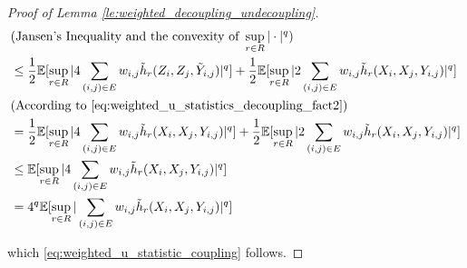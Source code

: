 \documentclass[letterpaper]{article} %
\def\SingleColumnEnd{}
\newcommand{\E}{\mathbb{E}}
\newcommand{\pair}[1]{(#1)}
\begin{document}
\begin{proof}[Proof of Lemma \ref{le:weighted_decoupling_undecoupling}]
\begin{align*}
        &(\text{Jansen's Inequality and the convexity of }\sup_{r\in R}|\cdot|^q)\\
        &\le \frac{1}{2}\E[\sup_{r\in R} |4\sum_{\pair{i,j}\in E}w_{i,j}\tilde{h}_r(Z_i,Z_j,\tilde{Y}_{i,j})|^q] + \frac{1}{2}\E[\sup_{r\in R} |2\sum_{\pair{i,j}\in E}w_{i,j}\tilde{h}_r(X_i,X_j,Y_{i,j})|^q]\\
        &(\text{According to }\eqref{eq:weighted_u_statistics_decoupling_fact2})\\
        &= \frac{1}{2}\E[\sup_{r\in R} |4\sum_{\pair{i,j}\in E}w_{i,j}\tilde{h}_r(X_i,X_j,Y_{i,j})|^q] + \frac{1}{2}\E[\sup_{r\in R} |2\sum_{\pair{i,j}\in E}w_{i,j}\tilde{h}_r(X_i,X_j,Y_{i,j})|^q]\\
        &\le \E[\sup_{r\in R} |4\sum_{\pair{i,j}\in E}w_{i,j}\tilde{h}_r(X_i,X_j,Y_{i,j})|^q]\\
        &= 4^q\E[\sup_{r\in R} |\sum_{\pair{i,j}\in E}w_{i,j}\tilde{h}_r(X_i,X_j,Y_{i,j})|^q]
    \end{align*}
    \SingleColumnEnd
    which \eqref{eq:weighted_u_statistic_coupling} follows.
\end{proof}
\end{document}
